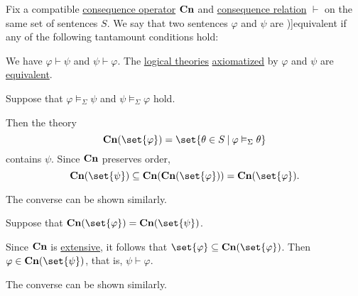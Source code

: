 \begin{definition}\label{def:consequence_formula_equivalence}\mimprovised
  Fix a compatible \hyperref[def:consequence_operator]{consequence operator} \( \op*{Cn} \) and \hyperref[def:consequence_relation]{consequence relation} \( {\vdash} \) on the same set of sentences \( S \). We say that two sentences \( \varphi \) and \( \psi \) are \term[ru=равносильные / эквивалентные (формулы) (\cite[44]{КолмогоровДрагалин2006})]{equivalent} if any of the following tantamount conditions hold:
  \begin{thmenum}
     We have \( \varphi \vdash \psi \) and \( \psi \vdash \varphi \).
     The \hyperref[def:logical_theory]{logical theories} \hyperref[def:logical_theory/generated]{axiomatized} by \( \varphi \) and \( \psi \) are \hyperref[def:logical_theory]{equivalent}.
  \end{thmenum}
\end{definition}
\begin{defproof}
   Suppose that \( \varphi \vDash_\Sigma \psi \) and \( \psi \vDash_\Sigma \varphi \) hold.

  Then the theory
  \begin{equation*}
    \op*{Cn}(\set{ \varphi }) = \set{ \theta \in S \given \varphi \vDash_\Sigma \theta }
  \end{equation*}
  contains \( \psi \). Since \( \op*{Cn} \) preserves order,
  \begin{equation*}
    \op*{Cn}(\set{ \psi }) \subseteq \op*{Cn}(\op*{Cn}(\set{ \varphi })) = \op*{Cn}(\set{ \varphi }).
  \end{equation*}

  The converse can be shown similarly.

   Suppose that \( \op*{Cn}(\set{ \varphi }) = \op*{Cn}(\set{ \psi }) \).

  Since \( \op*{Cn} \) is \hyperref[def:extensive_function]{extensive}, it follows that \( \set{ \varphi } \subseteq \op*{Cn}(\set{ \varphi }) \). Then \( \varphi \in \op*{Cn}(\set{ \psi }) \), that is, \( \psi \vdash \varphi \).

  The converse can be shown similarly.
\end{defproof}

